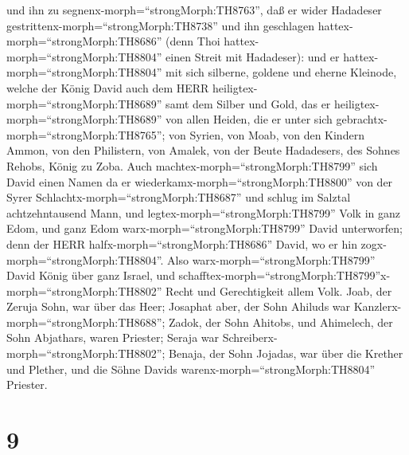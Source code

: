 und ihn zu segnenx-morph=``strongMorph:TH8763'', daß er wider Hadadeser
gestrittenx-morph=``strongMorph:TH8738'' und ihn geschlagen
hattex-morph=``strongMorph:TH8686'' (denn Thoi
hattex-morph=``strongMorph:TH8804'' einen Streit mit Hadadeser): und er
hattex-morph=``strongMorph:TH8804'' mit sich silberne, goldene und
eherne Kleinode,  welche der König David auch dem HERR
heiligtex-morph=``strongMorph:TH8689'' samt dem Silber und Gold, das er
heiligtex-morph=``strongMorph:TH8689'' von allen Heiden, die er unter
sich gebrachtx-morph=``strongMorph:TH8765'';  von Syrien,
von Moab, von den Kindern Ammon, von den Philistern, von Amalek, von der
Beute Hadadesers, des Sohnes Rehobs, König zu Zoba.  Auch
machtex-morph=``strongMorph:TH8799'' sich David einen Namen da er
wiederkamx-morph=``strongMorph:TH8800'' von der Syrer
Schlachtx-morph=``strongMorph:TH8687'' und schlug im Salztal
achtzehntausend Mann,  und
legtex-morph=``strongMorph:TH8799'' Volk in ganz Edom, und ganz Edom
warx-morph=``strongMorph:TH8799'' David unterworfen; denn der HERR
halfx-morph=``strongMorph:TH8686'' David, wo er hin
zogx-morph=``strongMorph:TH8804''.  Also
warx-morph=``strongMorph:TH8799'' David König über ganz Israel, und
schafftex-morph=``strongMorph:TH8799''x-morph=``strongMorph:TH8802''
Recht und Gerechtigkeit allem Volk.  Joab, der Zeruja Sohn,
war über das Heer; Josaphat aber, der Sohn Ahiluds war
Kanzlerx-morph=``strongMorph:TH8688'';  Zadok, der Sohn
Ahitobs, und Ahimelech, der Sohn Abjathars, waren Priester; Seraja war
Schreiberx-morph=``strongMorph:TH8802'';  Benaja, der Sohn
Jojadas, war über die Krether und Plether, und die Söhne Davids
warenx-morph=``strongMorph:TH8804'' Priester.

\hypertarget{section-8}{%
\section{9}\label{section-8}}

